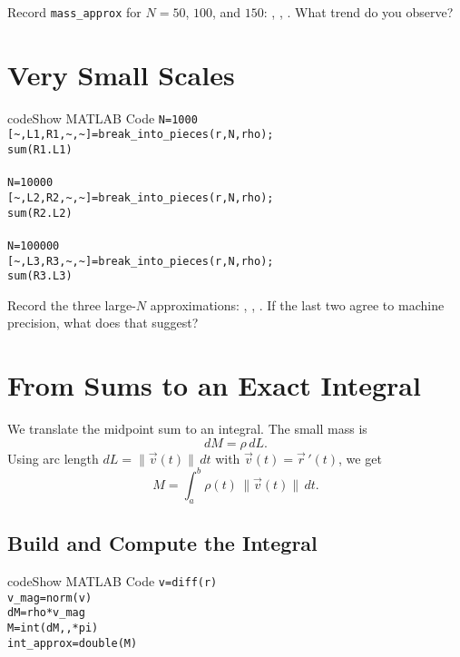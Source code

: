\documentclass{ximera}
\begin{document}
\begin{problem}
Record \texttt{mass\_approx} for \(N=50\), \(100\), and \(150\): , , . What trend do you observe?
\end{problem}

\section*{Very Small Scales}

\begin{expandable}{code}{Show MATLAB Code}
\texttt{N=1000}\\
\texttt{[\textasciitilde,\;L1,\;R1,\;\textasciitilde,\;\textasciitilde]\;=\;break\_into\_pieces(r,\;N,\;rho);}\\
\texttt{sum(R1.\*\;L1)}\\
\\
\texttt{N=10000}\\
\texttt{[\textasciitilde,\;L2,\;R2,\;\textasciitilde,\;\textasciitilde]\;=\;break\_into\_pieces(r,\;N,\;rho);}\\
\texttt{sum(R2.\*\;L2)}\\
\\
\texttt{N=100000}\\
\texttt{[\textasciitilde,\;L3,\;R3,\;\textasciitilde,\;\textasciitilde]\;=\;break\_into\_pieces(r,\;N,\;rho);}\\
\texttt{sum(R3.\*\;L3)}
\end{expandable}

\begin{problem}
Record the three large-\(N\) approximations: , , . If the last two agree to machine precision, what does that suggest? 
\end{problem}

\section*{From Sums to an Exact Integral}

We translate the midpoint sum to an integral. The small mass is
\[
dM = \rho\,dL.
\]
Using arc length $dL = \|\vec v(t)\|\,dt$ with $\vec v(t)=\vec r\,'(t)$, we get
\[
M = \int_a^b \rho(t)\,\|\vec v(t)\|\,dt.
\]

\subsection*{Build and Compute the Integral}

\begin{expandable}{code}{Show MATLAB Code}
\texttt{v\;=\;diff(r)}\\
\texttt{v\_mag\;=\;norm(v)}\\
\texttt{dM\;=\;rho\;*\;v\_mag}\\
\texttt{M\;=\;int(dM,,*pi)}\\
\texttt{int\_approx\;=\;double(M)}
\end{expandable}
\end{document}
